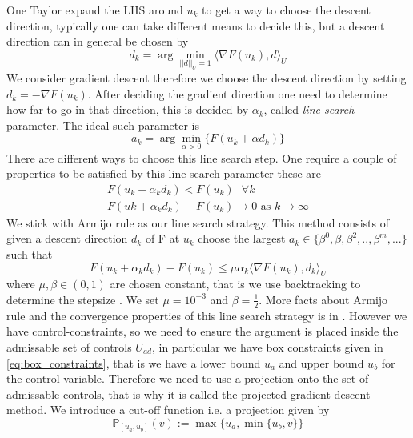 One Taylor expand the LHS around $u_k$ to get a way to choose the descent direction, typically one can take different means to decide this, but a descent direction can in general be chosen by 
\begin{equation*}
    d_k = \arg\min_{||d||_U=1} \langle \nabla F(u_k), d \rangle_U
\end{equation*}
We consider gradient descent therefore we choose the descent direction by setting $d_k = -\nabla F(u_k)$. After deciding the gradient direction one need to determine how far to go in that direction, this is decided by $\alpha_k$, called \textit{line search} parameter. The ideal such parameter is 
\begin{equation*}
    a_k = \arg \min_{\alpha>0} \{ F(u_k + \alpha d_k) \}
\end{equation*}
There are different ways to choose this line search step. One require a couple of properties to be satisfied by this line search parameter these are
\begin{align*}
    F(u_k + \alpha_kd_k) < F(u_k) \text{  } \forall k \\
    F(uk + \alpha_k d_k) - F(u_k) \rightarrow 0 \text{ as } k\rightarrow \infty
\end{align*}
We stick with Armijo rule as our line search strategy. This method consists of given a descent direction $d_k$ of F at $u_k$ choose the largest $a_k \in \{ \beta^0, \beta, \beta^2,..,\beta^m,... \}$ such that
\begin{equation*}
    F (u_k + \alpha_kd_k) - F(u_k) \leq \mu \alpha_k \langle \nabla F(u_k),d_k \rangle_{U}
\end{equation*}
where $\mu,\beta  \in (0,1)$ are chosen constant, that is we use backtracking to determine the stepsize \cite{iterativeMethods}. We set $\mu = 10^{-3}$ and $\beta = \frac{1}{2}$. More facts about Armijo rule and the convergence properties of this line search strategy is in \cite{numMethods} \cite{iterativeMethods}. However we have control-constraints, so we need to ensure the argument is placed inside the admissable set of controls $U_{ad}$, in particular we have box constraints given in \eqref{eq:box_constraints}, that is we have a lower bound $u_a$ and upper bound $u_b$ for the control variable. Therefore we need to use a projection onto the set of admissable controls, that is why it is called the projected gradient descent method. We introduce a cut-off function i.e. a projection given by
\begin{equation}
    \label{eq:projection}
    \mathbb{P}_{[u_a,u_b]}(v) := \max \{u_a, \min \{u_b,v \} \}
\end{equation}
